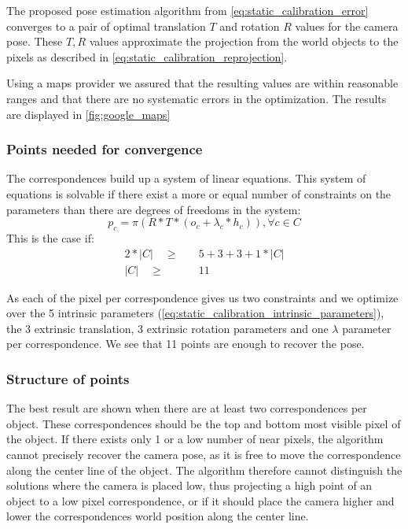 The proposed pose estimation algorithm from \autoref{eq:static_calibration_error} converges to a pair of optimal translation $T$ and rotation $R$ values for the camera pose.
These $T, R$ values approximate the projection from the world objects to the pixels as described in \autoref{eq:static_calibration_reprojection}.

Using a maps provider we assured that the resulting values are within reasonable ranges and that there are no systematic errors in the optimization.
The results are displayed in \autoref{fig:google_maps}

\subsubsection{Points needed for convergence}
The correspondences build up a system of linear equations. 
This system of equations is solvable if there exist a more or equal number of constraints on the parameters than there are degrees of freedoms in the system:
\begin{equation}
  \label{eq:static_calibration_reprojection_evaluation}
  p_c = \pi \left(  
    R * T *
    (o_c + \lambda_c * h_c)
  \right), \forall c \in C
\end{equation}
This is the case if:
\begin{equation}
  \begin{split}
  2 * \left\lvert C \right\rvert \quad \geq& \quad 5 + 3 + 3 + 1 * \left\lvert C \right\rvert \\
  \left\lvert C \right\rvert \quad \geq& \quad 11 
\end{split}
\end{equation} 

As each of the pixel per correspondence gives us two constraints and we optimize over the 5 intrinsic parameters (\autoref{eq:static_calibration_intrinsic_parameters}), the 3 extrinsic translation, 3 extrinsic rotation parameters and one $\lambda$ parameter per correspondence.
We see that 11 points are enough to recover the pose.

\subsubsection{Structure of points}
The best result are shown when there are at least two correspondences per object.
These correspondences should be the top and bottom most visible pixel of the object.
If there exists only 1 or a low number of near pixels, the algorithm cannot precisely recover the camera pose, as it is free to move the correspondence along the center line of the object.
The algorithm therefore cannot distinguish the solutions where the camera is placed low, thus projecting a high point of an object to a low pixel correspondence, 
or if it should place the camera higher and lower the correspondences world position along the center line.

